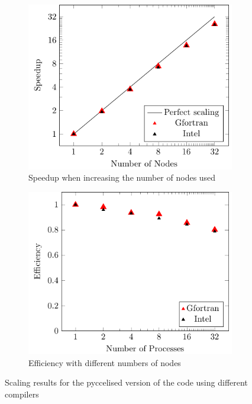 \begin{figure}
\begin{subfigure}[t]{0.45\textwidth}
 \includegraphics[width=\textwidth]{Figs/PythonScaling/Speedup}
 \caption{\label{fig::Speedup}Speedup when increasing the number of nodes used}
\end{subfigure}
\hspace{.05\textwidth}
\begin{subfigure}[t]{0.45\textwidth}
 \includegraphics[width=\textwidth]{Figs/PythonScaling/Efficiency}
 \caption{\label{fig::Efficiency}Efficiency with different numbers of nodes}
\end{subfigure}
\caption{\label{fig::Scaling results} Scaling results for the pyccelised version of the code using different compilers}
\end{figure}


